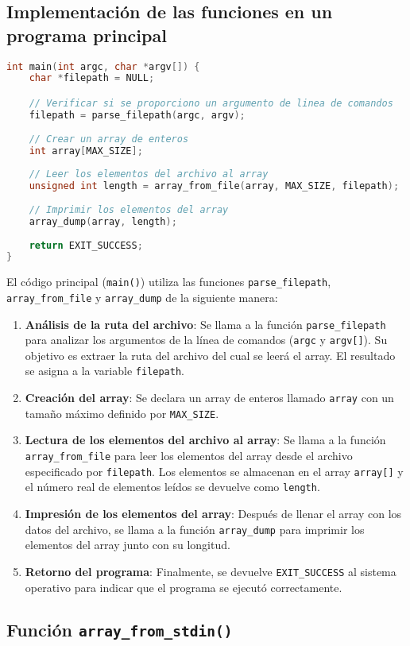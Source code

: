 \subsection{Implementación de las funciones en un programa principal}

\begin{lstlisting}[language=C]
int main(int argc, char *argv[]) {
    char *filepath = NULL;

    // Verificar si se proporciono un argumento de linea de comandos
    filepath = parse_filepath(argc, argv);
    
    // Crear un array de enteros
    int array[MAX_SIZE];
    
    // Leer los elementos del archivo al array
    unsigned int length = array_from_file(array, MAX_SIZE, filepath);
    
    // Imprimir los elementos del array
    array_dump(array, length);
    
    return EXIT_SUCCESS;
}
\end{lstlisting}

El código principal (\texttt{main()}) utiliza las funciones \texttt{parse\_filepath}, \texttt{array\_from\_file} y \texttt{array\_dump} de la siguiente manera:

\begin{enumerate}
    \item \textbf{Análisis de la ruta del archivo}: Se llama a la función \texttt{parse\_filepath} para analizar los argumentos de la línea de comandos (\texttt{argc} y \texttt{argv[]}). Su objetivo es extraer la ruta del archivo del cual se leerá el array. El resultado se asigna a la variable \texttt{filepath}.
    
    \item \textbf{Creación del array}: Se declara un array de enteros llamado \texttt{array} con un tamaño máximo definido por \texttt{MAX\_SIZE}.
    
    \item \textbf{Lectura de los elementos del archivo al array}: Se llama a la función \texttt{array\_from\_file} para leer los elementos del array desde el archivo especificado por \texttt{filepath}. Los elementos se almacenan en el array \texttt{array[]} y el número real de elementos leídos se devuelve como \texttt{length}.
    
    \item \textbf{Impresión de los elementos del array}: Después de llenar el array con los datos del archivo, se llama a la función \texttt{array\_dump} para imprimir los elementos del array junto con su longitud.
    
    \item \textbf{Retorno del programa}: Finalmente, se devuelve \texttt{EXIT\_SUCCESS} al sistema operativo para indicar que el programa se ejecutó correctamente.
\end{enumerate}

\subsection{Función \texttt{array\_from\_stdin()}}